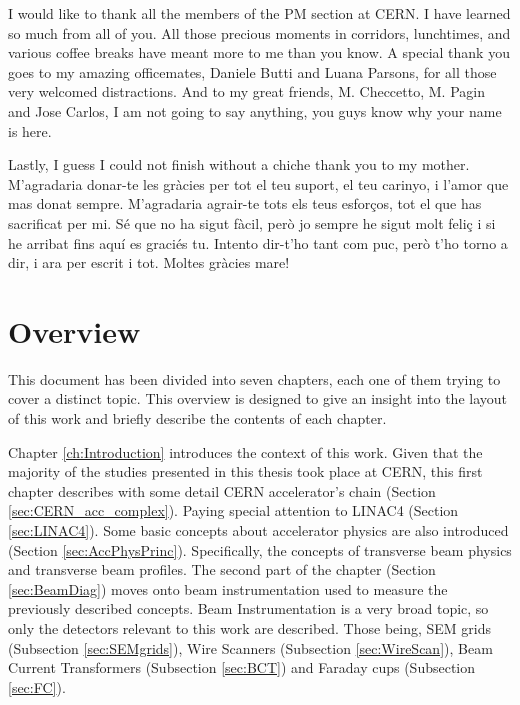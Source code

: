 I would like to thank all the members of the PM section at CERN. I have learned so much from all of you. All those precious moments in corridors, lunchtimes, and various coffee breaks have meant more to me than you know. A special thank you goes to my amazing officemates, Daniele Butti and Luana Parsons, for all those very welcomed distractions. And to my great friends, M. Checcetto, M. Pagin and Jose Carlos, I am not going to say anything, you guys know why your name is here. 

Lastly, I guess I could not finish without a chiche thank you to my mother. M'agradaria donar-te les gràcies per tot el teu suport, el teu carinyo, i l'amor que mas donat sempre. M'agradaria agrair-te tots els teus esforços, tot el que has sacrificat per mi. Sé que no ha sigut fàcil, però jo sempre he sigut molt feliç i si he arribat fins aquí es graciés tu. Intento dir-t'ho tant com puc, però t'ho torno a dir, i ara per escrit i tot. Moltes gràcies mare!

\tableofcontents
{}

\listoffigures
{}


\chapter*{Overview} \label{Overview}

This document has been divided into seven chapters, each one of them trying to cover a distinct topic. This overview is designed to give an insight into the layout of this work and briefly describe the contents of each chapter.

Chapter \ref{ch:Introduction} introduces the context of this work. Given that the majority of the studies presented in this thesis took place at CERN, this first chapter describes with some detail CERN accelerator's chain (Section \ref{sec:CERN_acc_complex}). Paying special attention to LINAC4 (Section \ref{sec:LINAC4}). Some basic concepts about accelerator physics are also introduced (Section \ref{sec:AccPhysPrinc}). Specifically, the concepts of transverse beam physics and transverse beam profiles. The second part of the chapter (Section \ref{sec:BeamDiag}) moves onto beam instrumentation used to measure the previously described concepts. Beam Instrumentation is a very broad topic, so only the detectors relevant to this work are described. Those being, SEM grids (Subsection \ref{sec:SEMgrids}), Wire Scanners (Subsection \ref{sec:WireScan}), Beam Current Transformers (Subsection \ref{sec:BCT}) and Faraday cups (Subsection \ref{sec:FC}).  

